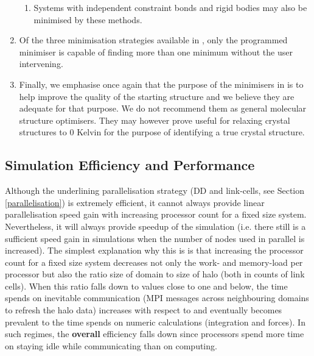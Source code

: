 \begin{enumerate}
\begin{enumerate}
\item Systems with independent constraint bonds and rigid bodies may
also be minimised by these methods.
\end{enumerate}

\item Of the three minimisation strategies available in \D, only the
programmed minimiser is capable of finding more than one minimum
without the user intervening.

\item Finally, we emphasise once again that the purpose of the
minimisers in \D is to help improve the quality of the starting
structure and we believe they are adequate for that purpose.  We do
not recommend them as general molecular structure optimisers.  They
may however prove useful for relaxing crystal structures to 0 Kelvin
for the purpose of identifying a true crystal structure.
\end{enumerate}

\subsection{Simulation Efficiency and Performance}

Although the \D underlining parallelisation strategy (DD and
link-cells, see Section \ref{parallelisation}) is extremely
efficient, it cannot always provide linear parallelisation speed
gain with increasing processor count for a fixed size system.
Nevertheless, it will always provide speedup of the simulation (i.e.
there still is a sufficient speed gain in simulations when the
number of nodes used in parallel is increased).  The simplest
explanation why this is is that increasing the processor count for a
fixed size system decreases not only the work- and memory-load per
processor but also the ratio size of domain to size of halo (both in
counts of link cells).  When this ratio falls down to values close
to one and below, the time \D spends on inevitable communication
(MPI messages across neighbouring domains to refresh the halo data)
increases with respect to and eventually becomes prevalent to the
time \D spends on numeric calculations (integration and forces).  In
such regimes, the {\bf overall} \D efficiency falls down since
processors spend more time on staying idle while communicating than
on computing.

